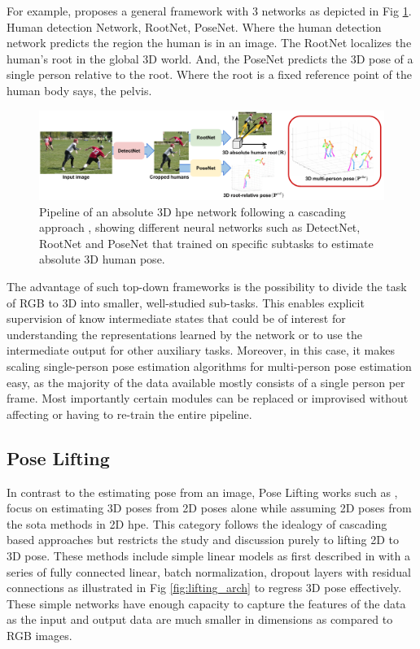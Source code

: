 For example, \cite{CameraDistanceAware} proposes a general framework with 3 networks as depicted in Fig \ref{fig:CameraDistanceAware}. Human detection Network, RootNet, PoseNet. Where the human detection network predicts the region the human is in an image. The RootNet localizes the human's root in the global 3D world. And, the PoseNet predicts the 3D pose of a single person relative to the root. Where the root is a fixed reference point of the human body says, the pelvis.

\begin{figure}[h]
    \centering
    \includegraphics[width=\linewidth]{figures/background/cascading_arch.pdf}
    \caption{Pipeline of an absolute 3D \ac{hpe} network following a cascading approach \cite{CameraDistanceAware}, showing different neural networks such as DetectNet, RootNet and PoseNet that trained on specific subtasks to estimate absolute 3D human pose.}
    \label{fig:CameraDistanceAware}
\end{figure}

The advantage of such top-down frameworks is the possibility to divide the task of RGB to 3D into smaller, well-studied sub-tasks. This enables explicit supervision of know intermediate states that could be of interest for understanding the representations learned by the network or to use the intermediate output for other auxiliary tasks. Moreover, in this case, it makes scaling single-person pose estimation algorithms for multi-person pose estimation easy, as the majority of the data available mostly consists of a single person per frame. Most importantly certain modules can be replaced or improvised without affecting or having to re-train the entire pipeline.

\subsection{Pose Lifting}

In contrast to the estimating pose from an image, Pose Lifting works such as \cite{poselifter,  amazon1, repnet, c3dpo, unsupervisedAdversarial}, focus on estimating 3D poses from 2D poses alone while assuming 2D poses from the \ac{sota} methods in 2D \ac{hpe}. This category follows the idealogy of cascading based approaches but restricts the study and discussion purely to lifting 2D to 3D pose. These methods include simple linear models as first described in \cite{MartinezHRL17} with a series of fully connected linear, batch normalization, dropout layers with residual connections as illustrated in Fig \ref{fig:lifting_arch} to regress 3D pose effectively. These simple networks have enough capacity to capture the features of the data as the input and output data are much smaller in dimensions as compared to RGB images.

